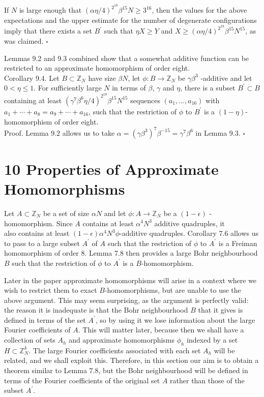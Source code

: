 \documentclass[10pt]{article}
\begin{document}
If $N$ is large enough that $(\alpha \eta / 4)^{2^{19}} \beta^{15} N \geqslant 3^{16}$, then the values for the above expectations and the upper estimate for the number of degenerate configurations imply that there exists a set $B^{\prime}$ such that $\eta X \geqslant Y$ and $X \geqslant(\alpha \eta / 4)^{2^{19}} \beta^{15} N^{15}$, as was claimed. \(\square\)

Lemmas 9.2 and 9.3 combined show that a somewhat additive function can be restricted to an approximate homomorphism of order eight.\\
Corollary 9.4. Let $B \subset \mathbb{Z}_{N}$ have size $\beta N$, let $\phi: B \rightarrow \mathbb{Z}_{N}$ be $\gamma \beta^{3}$ -additive and let $0<\eta\leqslant 1$. For sufficiently large $N$ in terms of $\beta$, $\gamma$ and $\eta$, there is a subset $B^{\prime} \subset B$ containing at least $\left(\gamma^{7} \beta^{6} \eta / 4\right)^{2^{19}} \beta^{15} N^{15}$ sequences $\left(a_{1}, \ldots, a_{16}\right)$ with $a_{1}+\cdots+a_{8}=a_{9}+\cdots+a_{16}$, such that the restriction of $\phi$ to $B^{\prime}$ is a $(1-\eta)$-homomorphism of order eight.\\
Proof. Lemma 9.2 allows us to take $\alpha=\left(\gamma \beta^{3}\right)^{7} \beta^{-15}=\gamma^{7} \beta^{6}$ in Lemma 9.3. \(\square\)

\section*{10 Properties of Approximate Homomorphisms}
Let $A \subset \mathbb{Z}_{N}$ be a set of size $\alpha N$ and let $\phi: A \rightarrow \mathbb{Z}_{N}$ be a $(1-\epsilon)$ -homomorphism. Since $A$ contains at least $\alpha^{4} N^{3}$ additive quadruples, it\\
also contains at least $(1-\epsilon) \alpha^{4} N^{3} \phi$-additive quadruples. Corollary 7.6 allows us to pass to a large subset $A^{\prime}$ of $A$ such that the restriction of $\phi$ to $A^{\prime}$ is a Freiman homomorphism of order 8. Lemma 7.8 then provides a large Bohr neighbourhood $B$ such that the restriction of $\phi$ to $A^{\prime}$ is a $B$-homomorphism.

Later in the paper approximate homomorphisms will arise in a context where we wish to restrict them to exact $B$-homomorphisms, but are unable to use the above argument. This may seem surprising, as the argument is perfectly valid: the reason it is inadequate is that the Bohr neighbourhood $B$ that it gives is defined in terms of the set $A^{\prime}$, so by using it we lose information about the large Fourier coefficients of $A$. This will matter later, because then we shall have a collection of sets $A_{h}$ and approximate homomorphisms $\phi_{h}$ indexed by a set $H \subset \mathbb{Z}_{N}^{k}$. The large Fourier coefficients associated with each set $A_{h}$ will be related, and we shall exploit this. Therefore, in this section our aim is to obtain a theorem similar to Lemma 7.8, but the Bohr neighbourhood will be defined in terms of the Fourier coefficients of the original set $A$ rather than those of the subset $A^{\prime}$.
\end{document}
